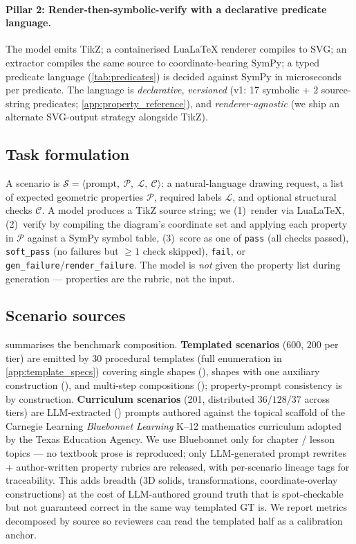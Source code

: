 \paragraph{Pillar 2: Render-then-symbolic-verify with a declarative predicate language.}
The model emits TikZ; a containerised LuaLaTeX renderer compiles to SVG; an extractor compiles the same source to coordinate-bearing SymPy; a typed predicate language (\cref{tab:predicates}) is decided against SymPy in microseconds per predicate.
The language is \emph{declarative}, \emph{versioned} (v1: 17 symbolic + 2 source-string predicates; \cref{app:property_reference}), and \emph{renderer-agnostic} (we ship an alternate SVG-output strategy alongside TikZ).

\subsection{Task formulation}
\label{ssec:task}

A \GeoGenBench scenario is $\mathcal{S} = \langle \text{prompt},\ \mathcal{P},\ \mathcal{L},\ \mathcal{C} \rangle$: a natural-language drawing request, a list of expected geometric properties $\mathcal{P}$, required labels $\mathcal{L}$, and optional structural checks $\mathcal{C}$.
A model produces a TikZ source string; we (1)~render via LuaLaTeX, (2)~verify by compiling the diagram's coordinate set and applying each property in $\mathcal{P}$ against a SymPy symbol table, (3)~score as one of \texttt{pass} (all checks passed), \texttt{soft\_pass} (no failures but $\geq 1$ check skipped), \texttt{fail}, or \texttt{gen\_failure}/\texttt{render\_failure}.
The model is \emph{not} given the property list during generation --- properties are the rubric, not the input.

\subsection{Scenario sources}
\label{ssec:sources}

 summarises the benchmark composition.
\textbf{Templated scenarios} (600, $200$ per tier) are emitted by 30 procedural templates (full enumeration in \cref{app:template_specs}) covering single shapes (\tone), shapes with one auxiliary construction (\ttwo), and multi-step compositions (\tthree); property-prompt consistency is by construction.
\textbf{Curriculum scenarios} (201, distributed $36 / 128 / 37$ across tiers) are LLM-extracted (\sonnet) prompts authored against the topical scaffold of the Carnegie Learning \emph{Bluebonnet Learning} K--12 mathematics curriculum \citep{bluebonnet2024} adopted by the Texas Education Agency.
We use Bluebonnet only for chapter / lesson topics --- no textbook prose is reproduced; only LLM-generated prompt rewrites + author-written property rubrics are released, with per-scenario lineage tags for traceability.
This adds breadth (3D solids, transformations, coordinate-overlay constructions) at the cost of LLM-authored ground truth that is spot-checkable but not guaranteed correct in the same way templated GT is.
We report metrics decomposed by source so reviewers can read the templated half as a calibration anchor.

